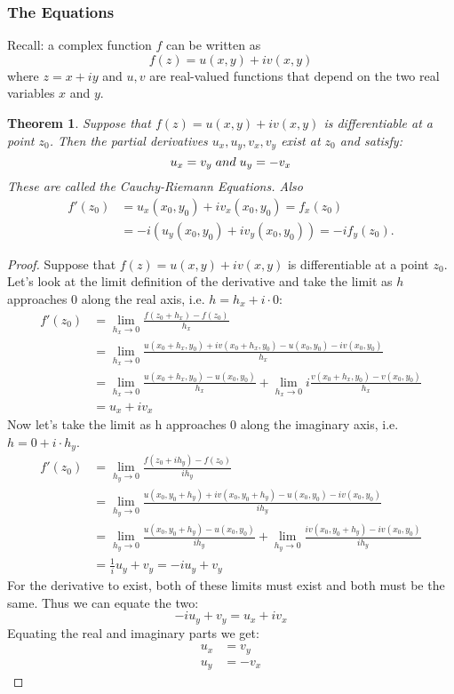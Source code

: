 \documentclass{article}
\newtheorem{theorem}{Theorem}[section]
\begin{document}
\subsubsection{The Equations}
Recall: a complex function $f$ can be written as
\begin{equation*}
f(z) = u(x, y) + iv(x, y)
\end{equation*}
where $z = x + iy$ and $u, v$ are real-valued functions that depend on the two real variables $x$ and $y$.
\begin{theorem}
Suppose that $f(z) = u(x, y) + iv(x, y)$ is differentiable at a point $z_0$. Then the partial derivatives $u_x, u_y, v_x, v_y$ exist at $z_0$ and satisfy:
\begin{equation*}
u_x = v_y \hspace{0.1cm} and \hspace{0.1cm} u_y = -v_x
\end{equation*}
These are called the Cauchy-Riemann Equations. Also
\begin{align*}
f'(z_0) &= u_x(x_0, y_0) + iv_x(x_0, y_0) = f_x(z_0) \\
&= -i(u_y(x_0, y_0) + iv_y(x_0, y_0)) = -if_y(z_0).
\end{align*}
\end{theorem}
\begin{proof}
Suppose that $f(z) = u(x, y) + iv(x, y)$ is differentiable at a point $z_0$. Let's look at the limit definition of the derivative and take the limit as $h$ approaches $0$ along the real axis, i.e. $h = h_x + i\cdot 0$:
\begin{align*}
f'(z_0) &= \lim_{h_x \to 0} \frac{f(z_0 + h_x) - f(z_0)}{h_x}\\
&= \lim_{h_x \to 0} \frac{u(x_0 + h_x, y_0) + iv(x_0 + h_x, y_0) - u(x_0, y_0) - iv(x_0, y_0)}{h_x}\\
&= \lim_{h_x \to 0} \frac{u(x_0 + h_x, y_0) - u(x_0, y_0)}{h_x} + \lim_{h_x \to 0} i\frac{v(x_0 + h_x, y_0) - v(x_0, y_0)}{h_x}\\
&=u_x + iv_x
\end{align*}
Now let's take the limit as h approaches 0 along the imaginary axis, i.e. $h = 0 + i\cdot h_y$.
\begin{align*}
f'(z_0) &= \lim_{h_y \to 0} \frac{f(z_0 + ih_y) - f(z_0)}{ih_y}\\
&= \lim_{h_y \to 0} \frac{u(x_0, y_0 + h_y) + iv(x_0, y_0 + h_y) - u(x_0, y_0) - iv(x_0, y_0)}{ih_y}\\
&= \lim_{h_y \to 0} \frac{u(x_0, y_0 + h_y) - u(x_0, y_0)}{ih_y} + \lim_{h_y \to 0} \frac{iv(x_0, y_0 + h_y) - iv(x_0, y_0)}{ih_y}\\
&= \frac{1}{i}u_y + v_y = -iu_y + v_y
\end{align*}
For the derivative to exist, both of these limits must exist and both must be the same. Thus we can equate the two:
\begin{equation*}
-iu_y + v_y = u_x + iv_x
\end{equation*}
Equating the real and imaginary parts we get:
\begin{align*}
u_x &= v_y\\
u_y &= -v_x
\end{align*}
\end{proof}
\end{document}
